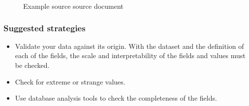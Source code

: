 \begin{figure}[ht]
    \centering
    \caption{Example source source document}
\end{figure}

\subsubsection*{Suggested strategies} 

\begin{itemize}
    \item Validate your data against its origin. With the dataset and the definition
    of each of the fields, the scale and interpretability of the fields and values must be checked.
    \item Check for extreme or strange values.
    \item Use database analysis tools to check the completeness of the fields.
\end{itemize}

